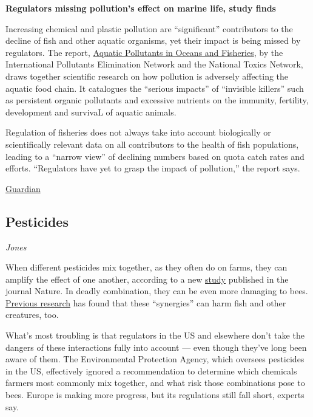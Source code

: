 \documentclass[
]{book}
\begin{document}
\textbf{Regulators missing pollution's effect on marine life, study finds}

Increasing chemical and plastic pollution are ``significant'' contributors to the decline of fish and other aquatic organisms, yet their impact is being missed by regulators.
The report, \href{https://ipen.org/transfer/embargo/aquatic_pollutants_in_oceans_and_fisheries_ipen-en.pdf}{Aquatic Pollutants in Oceans and Fisheries}, by the International Pollutants Elimination Network and the National Toxics Network, draws together scientific research on how pollution is adversely affecting the aquatic food chain. It catalogues the ``serious impacts'' of ``invisible killers'' such as persistent organic pollutants and excessive nutrients on the immunity, fertility, development and survivaL of aquatic animals.

Regulation of fisheries does not always take into account biologically or scientifically relevant data on all contributors to the health of fish populations, leading to a ``narrow view'' of declining numbers based on quota catch rates and efforts. ``Regulators have yet to grasp the impact of pollution,'' the report says.

\href{https://www.theguardian.com/environment/2021/apr/27/regulators-missing-pollutions-effect-on-marine-life-study-finds}{Guardian}

\hypertarget{pesticides}{%
\subsection{Pesticides}\label{pesticides}}

\emph{Jones}

When different pesticides mix together, as they often do on farms, they can amplify the effect of one another, according to a new \href{https://www.nature.com/articles/s41586-021-03787-7}{study} published in the journal Nature. In deadly combination, they can be even more damaging to bees. \href{https://www.fisheries.noaa.gov/feature-story/pesticide-mixtures-deadly-synergy-salmon}{Previous research} has found that these ``synergies'' can harm fish and other creatures, too.

What's most troubling is that regulators in the US and elsewhere don't take the dangers of these interactions fully into account --- even though they've long been aware of them. The Environmental Protection Agency, which oversees pesticides in the US, effectively ignored a recommendation to determine which chemicals farmers most commonly mix together, and what risk those combinations pose to bees. Europe is making more progress, but its regulations still fall short, experts say.
\end{document}
